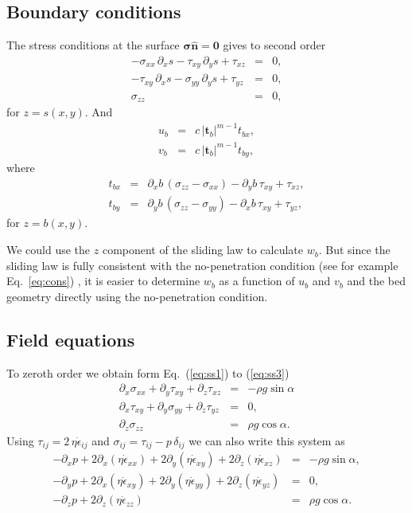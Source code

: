 \documentclass[10pt,a4paper]{book}
\newcommand{\p}{\partial}
\newcommand{\eij}{\dot{\epsilon}_{ij}}
\newcommand{\exx}{\dot{\epsilon}_{xx}}
\newcommand{\eyy}{\dot{\epsilon}_{yy}}
\newcommand{\ezz}{\dot{\epsilon}_{zz}}
\newcommand{\exz}{\dot{\epsilon}_{xz}}
\newcommand{\eyz}{\dot{\epsilon}_{yz}}
\newcommand{\exy}{\dot{\epsilon}_{xy}}
\newcommand{\sij}{\sigma_{ij}}
\newcommand{\tij}{\tau_{ij}}
\newcommand{\txy}{\tau_{xy}}
\newcommand{\txz}{\tau_{xz}}
\newcommand{\tyz}{\tau_{yz}}
\newcommand{\sxx}{\sigma_{xx}}
\newcommand{\syy}{\sigma_{yy}}
\newcommand{\szz}{\sigma_{zz}}
\newcommand{\normal}{\hat{\bm{n}}}
\begin{document}
\subsection{Boundary conditions}
The stress conditions at the surface $\bm{\sigma} \normal=\bm{0}$
gives to second order
\begin{eqnarray}
-\sxx \, \p_{x} s - \txy \, \p_{y} s + \txz &=&0 ,\label{eq:bcs1}\\
 -\txy \, \p_{x} s - \syy \, \p_{y} s + \tyz &=&0,\label{eq:bcs2}\\
\szz&=&0 \label{eq:bcs3},
\end{eqnarray}
for $z=s(x,y)$.  
And
\begin{eqnarray}
u_b&=& c \, |\bm{t}_b|^{m-1} t_{bx} ,\label{eq:bcb1}\\
v_b&=& c \, |\bm{t}_b|^{m-1} t_{by} ,\label{eq:bcb2}
\end{eqnarray}
where
\begin{eqnarray}
t_{bx}&=&\p_{x} b \,(\szz-\sxx)- \p_{y} b \,\txy +  \txz \label{eq:tb2x},\\
t_{by}&=&\p_{y} b \,(\szz-\syy)-\p_{x} b \,\txy + \tyz \label{eq:tb2y},
\end{eqnarray}
for $z=b(x,y)$.

We could use the $z$ component of the sliding law to calculate $w_b$.  But since the sliding law is
fully consistent with the no-penetration condition (see for example Eq.~\ref{eq:cons}) , it is
easier to determine $w_b$ as a function of $u_b$ and $v_b$ and the bed geometry directly using the
no-penetration condition.


\subsection{Field equations}
To zeroth order we obtain form Eq.~(\ref{eq:ss1}) to (\ref{eq:ss3}) 
\begin{eqnarray} 
\p_{x} \sxx+\p_{y} \txy + \p_{z} \txz &=& -\rho g \sin \alpha \label{eq:smx} \\ 
\p_{x} \txy+\p_{y} \syy + \p_{z} \tyz &=& 0 , \label{eq:smy}\\ 
\p_{z} \szz &=& \rho g \cos \alpha  \label{eq:smz}.
\end{eqnarray}
Using $\tij=2 \,\eta \eij$ and $\sij=\tij-p \,\delta_{ij}$ we can also write this system as
\begin{eqnarray} 
-\p_x p+ 2 \p_{x} (\eta \exx )+2 \p_{y} ( \eta \exy) + 2 \p_{z} ( \eta \exz) &=& -\rho g \sin \alpha, \label{eq:mx} \\ 
-\p_y p+ 2 \p_{x} ( \eta \exy )+2 \p_{y} ( \eta \eyy) + 2 \p_{z} ( \eta \eyz) &=& 0, \label{eq:my} \\ 
-\p_z p + 2 \p_{z} (\eta \ezz) &=& \rho g \cos \alpha \label{eq:mz}.
\end{eqnarray}
\end{document}
